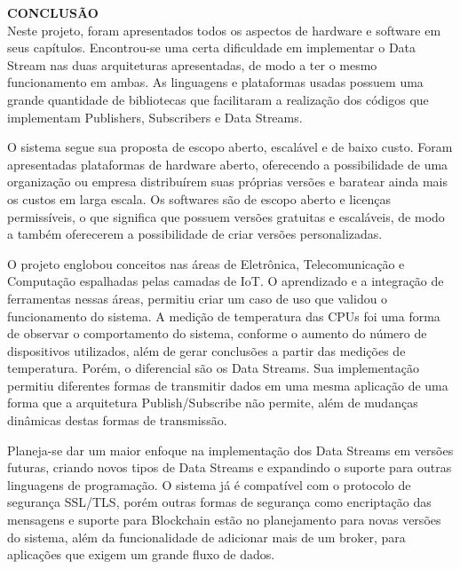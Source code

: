 \noindent\textbf{CONCLUSÃO}
$\!$\\


Neste projeto, foram apresentados todos os aspectos de hardware e software em seus capítulos. Encontrou-se uma certa dificuldade em implementar o Data Stream nas duas arquiteturas apresentadas, de modo a ter o mesmo funcionamento em ambas. As linguagens e plataformas usadas possuem uma grande quantidade de bibliotecas que facilitaram a realização dos códigos que implementam Publishers, Subscribers e Data Streams. 

O sistema segue sua proposta de escopo aberto, escalável e de baixo custo. Foram apresentadas plataformas de hardware aberto, oferecendo a possibilidade de uma organização ou empresa distribuírem suas próprias versões e baratear ainda mais os custos em larga escala. Os softwares são de escopo aberto e licenças permissíveis, o que significa que possuem versões gratuitas e escaláveis, de modo a também oferecerem a possibilidade de criar versões personalizadas.

O projeto englobou conceitos nas áreas de Eletrônica, Telecomunicação e Computação espalhadas pelas camadas de IoT. O aprendizado e a integração de ferramentas nessas áreas, permitiu criar um caso de uso que validou o funcionamento do sistema. A medição de temperatura das CPUs foi uma forma de observar o comportamento do sistema, conforme o aumento do número de dispositivos utilizados, além de gerar conclusões a partir das medições de temperatura. Porém, o diferencial são os Data Streams. Sua implementação permitiu diferentes formas de transmitir dados em uma mesma aplicação de uma forma que a arquitetura Publish/Subscribe não permite, além de mudanças dinâmicas destas formas de transmissão.

Planeja-se dar um maior enfoque na implementação dos Data Streams em versões futuras, criando novos tipos de Data Streams e expandindo o suporte para outras linguagens de programação. O sistema já é compatível com o protocolo de segurança SSL/TLS, porém outras formas de segurança como encriptação das mensagens e suporte para Blockchain estão no planejamento para novas versões do sistema, além da funcionalidade de adicionar mais de um broker, para aplicações que exigem um grande fluxo de dados.


\pagebreak



